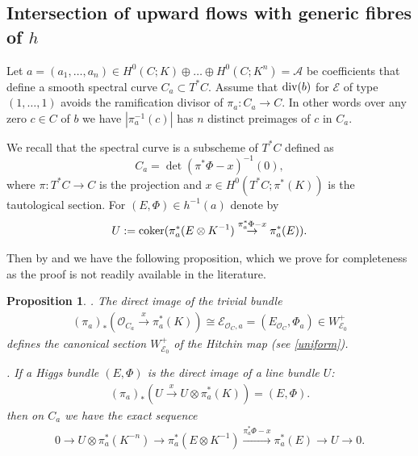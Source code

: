 \documentclass[12pt]{article}
\numberwithin{equation}{section}
\renewcommand{\div}{{\rm div}}
\newtheorem{proposition}[theorem]{Proposition}
\theoremstyle{remark}
\theoremstyle{definition}
\numberwithin{theorem}{section}
\def\beq{\begin{eqnarray}}
\def\eeq{\end{eqnarray}}
\def\calE{{\mathcal E}}
\def\calA{{\mathcal{A}}}
\def\calO{{\mathcal O}}
\renewcommand{\1}{\mathbbm{1}}
\begin{document}
\subsection{Intersection of upward flows with generic fibres of $h$}
\label{intersection}



Let ${{a}}=(a_1,\dots,a_n)\in H^0(C;K)\oplus \dots \oplus H^0(C;K^n)=\calA$ be coefficients that define a smooth spectral curve $C_a\subset T^*C$.   Assume that $\div(b)$ for $\calE$ of type $(1,\dots,1)$ avoids the ramification divisor of $\pi_a:C_a\to C$. In other words over any zero $c\in C$ of $b$ we have $|\pi_a^{-1}(c)|$ has $n$ distinct preimages of $c$ in $C_a$.   

We recall that the spectral curve is a subscheme of $T^*C$ defined as $$C_a=\det(\pi^*\Phi-x)^{-1}(0),$$ where $\pi:T^*C\to C$ is the projection and $x\in H^0(T^*C;\pi^*(K))$ is the tautological section.  For $(E,\Phi)\in h^{-1}(a)$ denote by \beq \label{definitionU}U:={\rm coker}(\pi_a^*(E\otimes K^{-1})\stackrel{\pi_a^*\Phi-x}{\to} \pi_a^*(E)).\eeq 

Then by \cite[\S 5.1]{hitchin-stable} and \cite[\S 3.7]{beauville-etal}  we have the following proposition, which we prove for completeness as the proof is not readily available in the literature.  

\begin{proposition}  
	
	. The direct image of the trivial bundle   \beq \label{canonicalBNR} (\pi_a)_*(\calO_{C_a}\stackrel{x}{\to}\pi_a^*(K))\cong \calE_{\calO_C, a}=(E_{\calO_C},\Phi_a)\in W^+_{\calE_0} \eeq   defines  the canonical section  $W^+_{\calE_0}$ of the Hitchin map (see \eqref{uniform}).
	
	. If a Higgs bundle $(E,\Phi)$ is the direct image of a line bundle $U$:
	\beq \label{utoephi}(\pi_a)_*(U\stackrel{x}{\to} U\otimes \pi_a^*(K))=(E,\Phi).\eeq then  on $C_a$ we have the exact sequence \beq\label{exactu}0\to  U\otimes \pi_a^*(K^{-n}) \to \pi_a^*(E\otimes K^{-1})\stackrel{\pi_a^*\Phi-x}{\to} \pi_a^*(E) \to U\to 0. \eeq 
\end{proposition}
\end{document}
